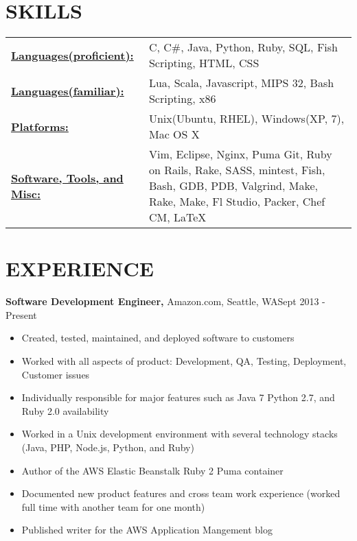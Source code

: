 \documentclass{res}
\begin{document}
 
\address{2226 Elliott Ave Apt 113, Seattle, WA 98121 (928) 284-5522 charliec364@gmail.com }


\begin{resume}
\footnotesize

\section{SKILLS}
   \begin{tabular}{l p{3in}}
     \underline{\bf Languages(proficient):} & C, C\#, Java, Python, Ruby, SQL, Fish Scripting, HTML, CSS \\
     \underline{\bf Languages(familiar):} & Lua, Scala, Javascript, MIPS 32, Bash Scripting, x86 \\
     \underline{\bf Platforms:} & Unix(Ubuntu, RHEL), Windows(XP, 7), Mac OS X \\
     \underline{\bf Software, Tools, and Misc:} &  Vim, Eclipse, Nginx, Puma
                        Git, Ruby on Rails, Rake, SASS, mintest,
                        Fish, Bash, GDB, PDB, Valgrind, Make, 
                        Rake, Make, Fl Studio, Packer, Chef CM, \LaTeX\
 \end{tabular}
 
\section{EXPERIENCE}
  {\bf Software Development Engineer,} Amazon.com, Seattle, WA\hfill Sept 2013 - Present
  \begin{itemize} \itemsep -2pt  %
    \item Created, tested, maintained, and deployed software to customers
    \item Worked with all aspects of product: Development, QA, Testing, Deployment, Customer issues
    \item Individually responsible for major features such as Java 7 Python 2.7, and Ruby 2.0 availability
    \item Worked in a Unix development environment with several technology stacks (Java, PHP, Node.js, Python, and Ruby)
    \item Author of the AWS Elastic Beanstalk Ruby 2 Puma container
    \item Documented new product features and cross team work experience (worked full time with another team for one month)
    \item Published writer for the AWS Application Mangement blog
  \end{itemize}


\end{resume}
\end{document}
